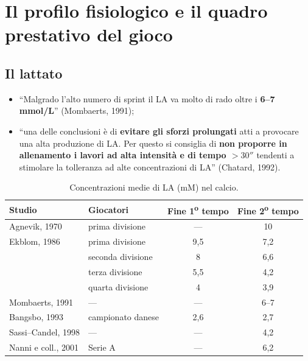 \section{Il profilo fisiologico e il quadro prestativo del gioco}

\subsection{Il lattato}

\begin{itemize}
  \item ``Malgrado l'alto numero di sprint il LA va molto di rado oltre i \textbf{6--7 mmol/L}''
    (Mombaerts, 1991);
  \item ``una delle conclusioni è di \textbf{evitare gli sforzi prolungati} atti a provocare una
    alta produzione di LA. Per questo si consiglia di \textbf{non proporre in allenamento i lavori
    ad alta intensità e di tempo $> 30''$} tendenti a stimolare la tolleranza ad alte
    concentrazioni di LA'' (Chatard, 1992).
\end{itemize}

\begin{table}[htbp]
  \centering
  \small
  \renewcommand{\arraystretch}{1.3}
  \begin{tabularx}{\textwidth}{|X|X|c|c|}
    \hline
    \textbf{Studio} & \textbf{Giocatori} & \textbf{Fine 1\textsuperscript{o} tempo} &
      \textbf{Fine 2\textsuperscript{o} tempo} \\
    \hline
    Agnevik, 1970 & prima divisione & --- & 10 \\
    \hline
    Ekblom, 1986 & prima divisione & 9,5 & 7,2 \\
    \hline
     & seconda divisione & 8 & 6,6 \\
    \hline
     & terza divisione & 5,5 & 4,2 \\
    \hline
     & quarta divisione & 4 & 3,9 \\
    \hline
    Mombaerts, 1991 & --- & --- & 6--7 \\
    \hline
    Bangsbo, 1993 & campionato danese & 2,6 & 2,7 \\
    \hline
    Sassi--Candel, 1998 & --- & --- & 4,2 \\
    \hline
    Nanni e coll., 2001 & Serie A & --- & 6,2 \\
    \hline
  \end{tabularx}
  \caption*{Concentrazioni medie di LA (mM) nel calcio.}
\end{table}

